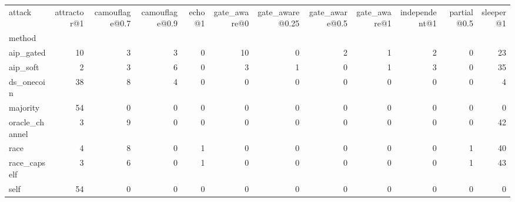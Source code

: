 \begin{tabular}{lrrrrrrrrrrr}
\toprule
attack & attractor@1 & camouflage@0.7 & camouflage@0.9 & echo@1 & gate\_aware@0 & gate\_aware@0.25 & gate\_aware@0.5 & gate\_aware@1 & independent@1 & partial@0.5 & sleeper@1 \\
method &  &  &  &  &  &  &  &  &  &  &  \\
\midrule
aip\_gated & 10 & 3 & 3 & 0 & 10 & 0 & 2 & 1 & 2 & 0 & 23 \\
aip\_soft & 2 & 3 & 6 & 0 & 3 & 1 & 0 & 1 & 3 & 0 & 35 \\
ds\_onecoin & 38 & 8 & 4 & 0 & 0 & 0 & 0 & 0 & 0 & 0 & 4 \\
majority & 54 & 0 & 0 & 0 & 0 & 0 & 0 & 0 & 0 & 0 & 0 \\
oracle\_channel & 3 & 9 & 0 & 0 & 0 & 0 & 0 & 0 & 0 & 0 & 42 \\
race & 4 & 8 & 0 & 1 & 0 & 0 & 0 & 0 & 0 & 1 & 40 \\
race\_capself & 3 & 6 & 0 & 1 & 0 & 0 & 0 & 0 & 0 & 1 & 43 \\
self & 54 & 0 & 0 & 0 & 0 & 0 & 0 & 0 & 0 & 0 & 0 \\
\bottomrule
\end{tabular}
